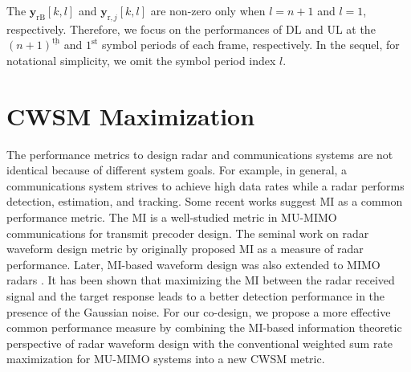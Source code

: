 \documentclass[9pt,journal]{IEEEtran}
\newcommand{\paren}[1]{\left({#1}\right)}
\newcommand{\bracket}[1]{{\left [{#1}\right ]}}
\newcommand{\ith}[1]    {{#1}^{\underline{\text{th}}}}
\theoremstyle{definition}
\begin{document}
The $\mathbf{y}_{\mathrm{rB}}\bracket{k,l}$ and $\mathbf{y}_{\mathrm{r},j}\bracket{k,l}$ are non-zero only
when $l=n+1$ and $l=1$, respectively. Therefore, we focus on the performances of DL and UL at the $\ith{\paren{n+1}}$ and $1^{\textrm{st}}$ symbol periods of each frame, respectively. In the sequel, for notational simplicity, we omit the symbol period index $l$.
\vspace{-1em}
\section{CWSM Maximization}
\label{sec: formulation}
The performance metrics to design radar and communications systems are not identical because of different system goals. For example, in general, a communications system strives to achieve high data rates while a radar performs detection, estimation, and tracking. Some recent works \cite{alaee2020information,dokhanchi2020multi} suggest MI as a common performance metric. The MI is a well-studied metric in MU-MIMO communications for transmit precoder design\cite{Luo2011IterativeWMMSE}. The seminal work on radar waveform design metric by \cite{Bellinformation} originally proposed MI as a measure of radar performance. Later, MI-based waveform design was also extended to MIMO radars \cite{Jammer_game,NaghshTSP2017}. It has been shown \cite{Jammer_game} that maximizing the MI between the radar received signal and the target response leads to a better detection performance in the presence of the Gaussian noise. For our co-design, we propose a more effective common performance measure by combining the MI-based information theoretic perspective of radar waveform design with the conventional weighted sum rate maximization for MU-MIMO systems into a new CWSM metric.
	
\end{document}
